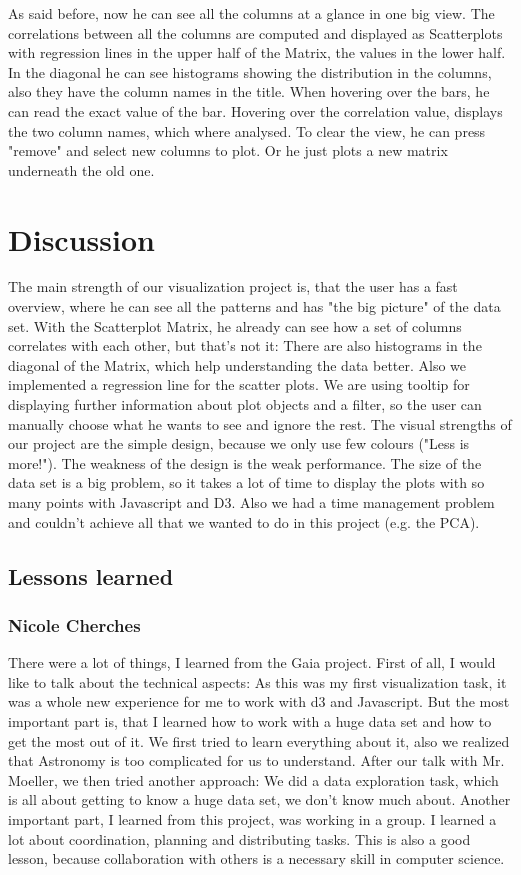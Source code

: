 \documentclass{vgtc}                          %
\begin{document}
As said before, now he can see all the columns at a glance in one big view. The correlations between all the columns are computed and displayed as Scatterplots with regression lines in the upper half of the Matrix, the values in the lower half. In the diagonal he can see histograms showing the distribution in the columns, also they have the column names in the title. When hovering over the bars, he can read the exact value of the bar. Hovering over the correlation value, displays the two column names, which where analysed. To clear the view, he can press "remove" and select new columns to plot. Or he just plots a new matrix underneath the old one.
\section{Discussion}
The main strength of our visualization project is, that the user has a fast overview, where he can see all the patterns and has "the big picture" of the data set. With the Scatterplot Matrix, he already can see how a set of columns correlates with each other, but that's not it: There are also histograms in the diagonal of the Matrix, which help understanding the data better. Also we implemented a regression line for the scatter plots. We are using tooltip for displaying further information about plot objects and a filter, so the user can manually choose what he wants to see and ignore the rest. The visual strengths of our project are the simple design, because we only use few colours ("Less is more!"). 
The weakness of the design is the weak performance. The size of the data set is a big problem, so it takes a lot of time to display the plots with so many points with Javascript and D3. Also we had a time management problem and couldn't achieve all that we wanted to do in this project (e.g. the PCA). 
\subsection{Lessons learned}
\subsubsection{Nicole Cherches}
There were a lot of things, I learned from the Gaia project. First of all, I would like to talk about the technical aspects: As this was my first visualization task, it was a whole new experience for me to work with d3 and Javascript. But the most important part is, that I learned how to work with a huge data set and how to get the most out of it. We first tried to learn everything about it, also we realized that Astronomy is too complicated for us to understand. After our talk with Mr. Moeller, we then tried another approach: We did a data exploration task, which is all about getting to know a huge data set, we don't know much about.  
Another important part, I learned from this project, was working in a group. I learned a lot about coordination, planning and distributing tasks. This is also a good lesson, because collaboration with others is a necessary skill in computer science.
\end{document}
